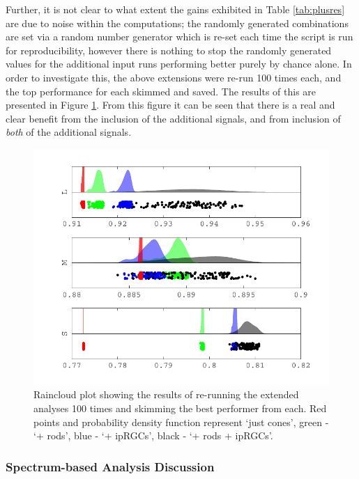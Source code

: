 Further, it is not clear to what extent the gains exhibited in Table \ref{tab:plusres} are due to noise within the computations; the randomly generated combinations are set via a random number generator which is re-set each time the script is run for reproducibility, however there is nothing to stop the randomly generated values for the additional input runs performing better purely by chance alone. In order to investigate this, the above extensions were re-run 100 times each, and the top performance for each skimmed and saved. The results of this are presented in Figure \ref{fig:relcontributions}. From this figure it can be seen that there is a real and clear benefit from the inclusion of the additional signals, and from inclusion of \emph{both} of the additional signals.

\begin{figure}[htbp]
\includegraphics[max width=\textwidth]{figs/LargeSphere/relcontributions.pdf}
\caption{Raincloud plot \cite{allen_raincloud_2019} showing the results of re-running the extended analyses 100 times and skimming the best performer from each. Red points and probability density function represent `just cones', green - `+ rods', blue - `+ \glspl{ipRGC}', black - `+ rods + \glspl{ipRGC}'.}
\label{fig:relcontributions}
\end{figure}

\subsubsection{Spectrum-based Analysis Discussion}

